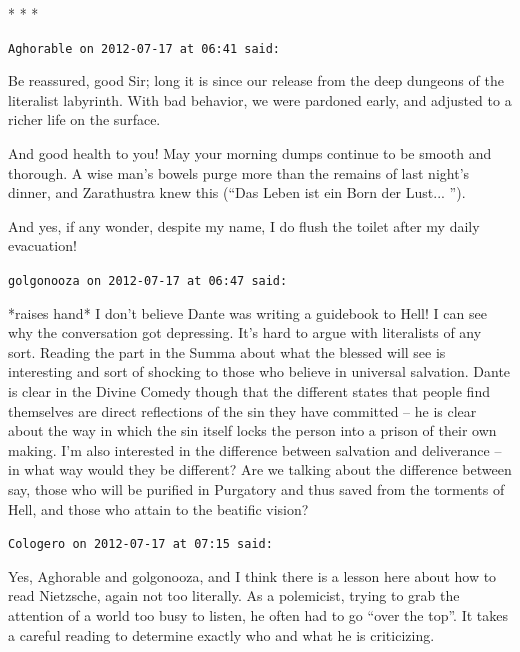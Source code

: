 
\begin{center}* * *\end{center}

\begin{footnotesize}
\begin{sffamily}
\texttt{Aghorable on 2012-07-17 at 06:41 said:}

Be reassured, good Sir; long it is since our release from the deep dungeons of the literalist labyrinth. With bad behavior, we were pardoned early, and adjusted to a richer life on the surface.

And good health to you! May your morning dumps continue to be smooth and thorough. A wise man's bowels purge more than the remains of last night's dinner, and Zarathustra knew this (``Das Leben ist ein Born der Lust... '').

And yes, if any wonder, despite my name, I do flush the toilet after my daily evacuation!

\hfill

\texttt{golgonooza on 2012-07-17 at 06:47 said:}

*raises hand* I don't believe Dante was writing a guidebook to Hell! I can see why the conversation got depressing. It's hard to argue with literalists of any sort. Reading the part in the Summa about what the blessed will see is interesting and sort of shocking to those who believe in universal salvation. Dante is clear in the Divine Comedy though that the different states that people find themselves are direct reflections of the sin they have committed -- he is clear about the way in which the sin itself locks the person into a prison of their own making. I'm also interested in the difference between salvation and deliverance -- in what way would they be different? Are we talking about the difference between say, those who will be purified in Purgatory and thus saved from the torments of Hell, and those who attain to the beatific vision?

\hfill

\texttt{Cologero on 2012-07-17 at 07:15 said:}

Yes, Aghorable and golgonooza, and I think there is a lesson here about how to read Nietzsche, again not too literally. As a polemicist, trying to grab the attention of a world too busy to listen, he often had to go ``over the top''. It takes a careful reading to determine exactly who and what he is criticizing.


\hfill

\end{sffamily}
\end{footnotesize}

